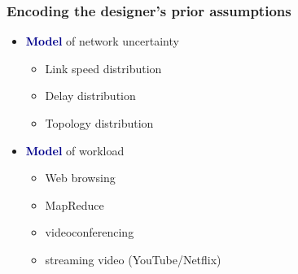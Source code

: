 \documentclass[svgnames]{beamer}
\begin{document}
\begin{frame}
\frametitle{Encoding the designer's prior assumptions}

\begin{itemize}

\Large

\item \textcolor{DarkBlue}{\bf Model} of network uncertainty

\begin{itemize}
\item Link speed distribution
\item Delay distribution
\item Topology distribution
\end{itemize}

\item \textcolor{DarkBlue}{\bf Model} of workload

\begin{itemize}
\item Web browsing
\item MapReduce
\item videoconferencing
\item streaming video (YouTube/Netflix)
\end{itemize}

\end{itemize}

\end{frame}
\end{document}
